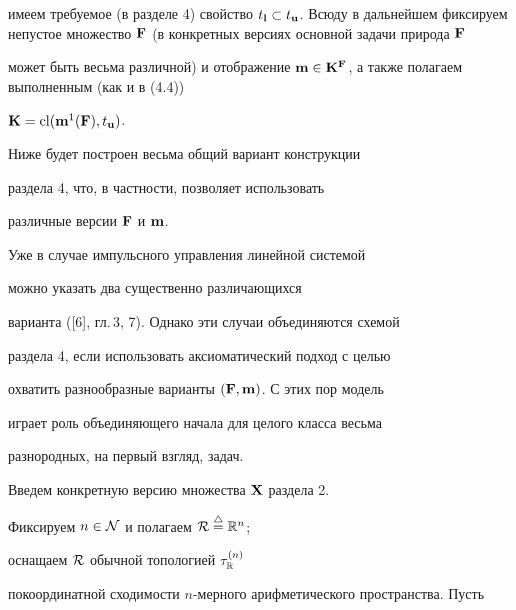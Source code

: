 имеем требуемое (в разделе 4) свойство ${t_{\bold l}} \subset


{t_{\bold u}}$. Всюду в дальнейшем фиксируем непустое множество ${\bold


F}$ (в конкретных версиях основной задачи природа ${\bold F}$


может быть весьма различной) и отображение ${\bold m} \in


{{\bold K}^{\bold F}}$, а также полагаем выполненным (как и в (4.4))





\begin{conds}


${\bold K} = {\operatorname{cl}}({{\bold m}^1}({\bold F}),{t_{\bold u}})$.


\end{conds}





\begin{notes}


Ниже будет построен весьма общий вариант конструкции


раздела 4, что, в частности, позволяет использовать


различные версии ${\bold F}$ и ${\bold m}$.


Уже в случае импульсного управления линейной системой


можно указать два существенно различающихся


варианта ([6], гл.\,3, 7). Однако эти случаи объединяются схемой


раздела 4, если использовать аксиоматический подход с целью


охватить разнообразные варианты $({\bold F},{\bold m})$. С этих пор модель


играет роль объединяющего начала для целого класса весьма


разнородных, на первый взгляд, задач.


\end{notes}





Введем конкретную версию множества ${\bold X}$ раздела 2.


Фиксируем $n \in {\cal N}$ и полагаем ${\cal R} \overset{\triangle}{=}{} {{\Bbb R}^n}$;


оснащаем ${\cal R}$ обычной топологией ${\tau}_{\Bbb R}^{(n)}$


покоординатной сходимости $n$-мерного арифметического пространства. Пусть



